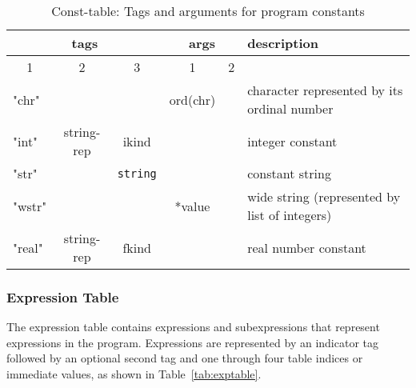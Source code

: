 \documentclass[11pt]{article}
\begin{document}
\begin{table}
\centering
\begin{tabular}{l|c|c||c|c||l}
\multicolumn{3}{c||}{tags} & \multicolumn{2}{|c||}{args} & description \\ \hline
\multicolumn{1}{c|}{1} & 2 & 3 & 1 & 2 & \\ \hline 
"chr" & & & ord(chr) & & character represented by its ordinal number \\
"int" & string-rep & ikind & & & integer constant \\
"str" & & {\tt string} & & & constant string \\
"wstr" & & & *value & & wide string (represented by list of integers) \\
"real" & string-rep & fkind & & & real number constant \\
\end{tabular}
\caption{\label{tab:consttable}Const-table: Tags and arguments for program constants}
\end{table}


\subsubsection{Expression Table}

The expression table contains expressions and subexpressions that represent
expressions in the program. 
Expressions are represented by an indicator tag followed by an optional second tag
and one through four table indices or immediate values, as shown in
Table~\ref{tab:exptable}. 
\end{document}

